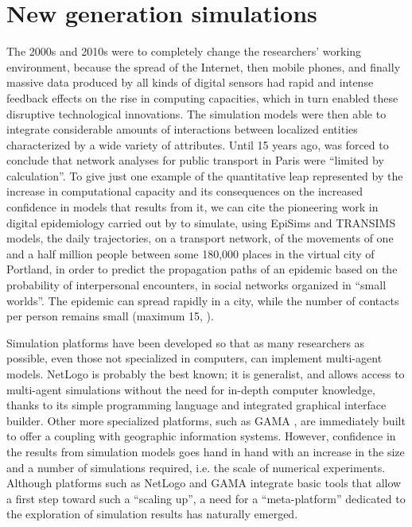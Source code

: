 \documentclass[10pt]{article}
\begin{document}
\section{New generation simulations}


The 2000s and 2010s were to completely change the researchers’ working environment, because the spread of the Internet, then mobile phones, and finally massive data produced by all kinds of digital sensors had rapid and intense feedback effects on the rise in computing capacities, which in turn enabled these disruptive technological innovations. The simulation models were then able to integrate considerable amounts of interactions between localized entities characterized by a wide variety of attributes. Until 15 years ago, \cite{gleyze2005vulnerabilite} was forced to conclude that network analyses for public transport in Paris were ``limited by calculation''. To give just one example of the quantitative leap represented by the increase in computational capacity and its consequences on the increased confidence in models that results from it, we can cite the pioneering work in digital epidemiology carried out by \cite{eubank2004modelling} to simulate, using EpiSims and TRANSIMS models, the daily trajectories, on a transport network, of the movements of one and a half million people between some 180,000 places in the virtual city of Portland, in order to predict the propagation paths of an epidemic based on the probability of interpersonal encounters, in social networks organized in “small worlds”. The epidemic can spread rapidly in a city, while the number of contacts per person remains small (maximum 15, \cite{eliot2006diffusion}).


Simulation platforms have been developed so that as many researchers as possible, even those not specialized in computers, can implement multi-agent models. NetLogo \citep{tisue2004netlogo} is probably the best known; it is generalist, and allows access to multi-agent simulations without the need for in-depth computer knowledge, thanks to its simple programming language and integrated graphical interface builder. Other more specialized platforms, such as GAMA \citep{grignard2013gama}, are immediately built to offer a coupling with geographic information systems. However, confidence in the results from simulation models goes hand in hand with an increase in the size and a number of simulations required, i.e. the scale of numerical experiments. Although platforms such as NetLogo and GAMA integrate basic tools that allow a first step toward such a ``scaling up'', a need for a ``meta-platform'' dedicated to the exploration of simulation results has naturally emerged.
\end{document}
